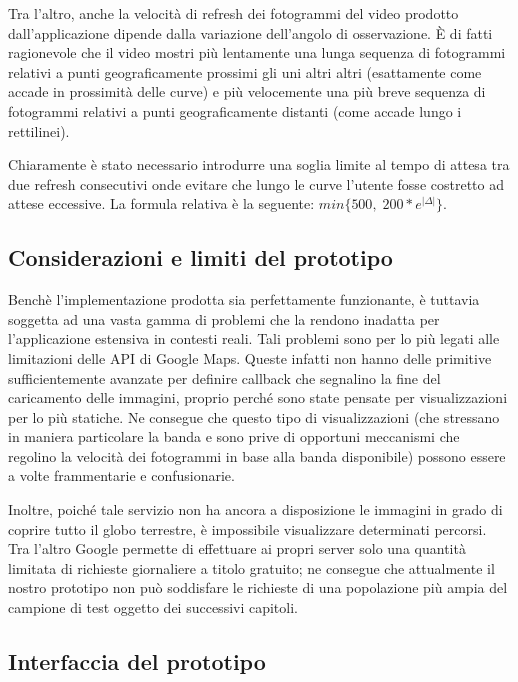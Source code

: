 \documentclass[12pt,a4paper,openright, notitlepage]{report}
\begin{document}
Tra l’altro, anche la velocità di refresh dei fotogrammi del video prodotto dall’applicazione dipende dalla variazione dell’angolo di osservazione. È di fatti ragionevole che il video mostri più lentamente una lunga sequenza di fotogrammi relativi a punti geograficamente prossimi gli uni altri altri (esattamente come accade in prossimità delle curve) e più velocemente una più breve sequenza di fotogrammi relativi a punti geograficamente distanti (come accade lungo i rettilinei). 

Chiaramente è stato necessario introdurre una soglia limite al tempo di attesa tra due refresh consecutivi onde evitare che lungo le curve l’utente fosse costretto ad attese eccessive. La formula relativa è la seguente: $min\{ 500, \; 200*e^{|\Delta|} \}$.

\subsection{Considerazioni e limiti del prototipo}

Benchè l’implementazione prodotta sia perfettamente funzionante, è tuttavia soggetta ad una vasta gamma di problemi che la rendono inadatta per l’applicazione estensiva in contesti reali. Tali problemi sono per lo più legati alle limitazioni delle API di Google Maps. Queste infatti non hanno delle primitive sufficientemente avanzate per definire callback che segnalino la fine del caricamento delle immagini, proprio perché sono state pensate per visualizzazioni per lo più statiche. Ne consegue che questo tipo di visualizzazioni (che stressano in maniera particolare la banda e sono prive di opportuni meccanismi che regolino la velocità dei fotogrammi in base alla banda disponibile) possono essere a volte frammentarie e confusionarie.

Inoltre, poiché tale servizio non ha ancora a disposizione le immagini in grado di coprire tutto il globo terrestre, è impossibile visualizzare determinati percorsi. Tra l’altro Google permette di effettuare ai propri server solo una quantità limitata di richieste giornaliere a titolo gratuito; ne consegue che attualmente il nostro prototipo non può soddisfare le richieste di una popolazione più ampia del campione di test oggetto dei successivi capitoli.

\subsection{Interfaccia del prototipo}
\end{document}

